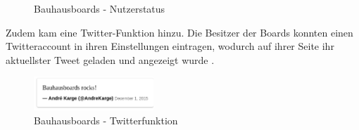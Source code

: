 \begin{figure}
  \centering
  \caption{Bauhausboards - Nutzerstatus}
  \label{img:UserAvailable}
\end{figure}
Zudem kam eine Twitter-Funktion hinzu. Die Besitzer der Boards konnten einen Twitteraccount in ihren Einstellungen eintragen, wodurch auf ihrer Seite ihr aktuellster Tweet geladen und angezeigt wurde . 
\begin{figure}
  \centering
    \includegraphics[width=0.4\textwidth]{./img/TwitterFeature.png}
  \caption{Bauhausboards - Twitterfunktion}
  \label{img:twitter}
\end{figure}



